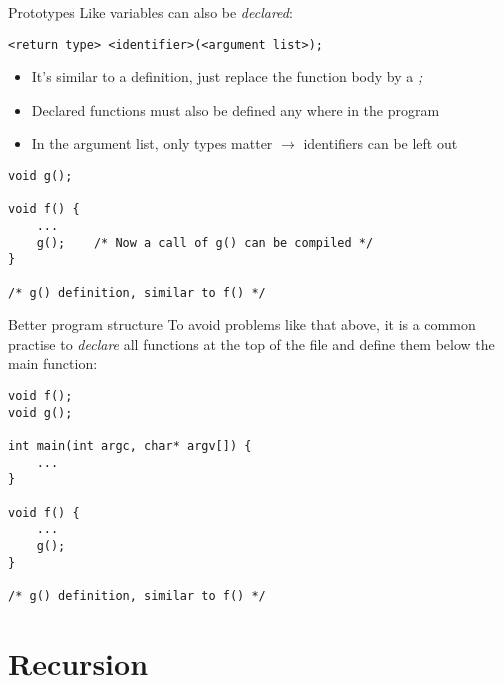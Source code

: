 \begin{frame}[fragile]{Prototypes}
	Like variables can also be \textit{declared}:
	\begin{lstlisting}[numbers=none]
<return type> <identifier>(<argument list>);
\end{lstlisting}
	\begin{itemize}
		\item It's similar to a definition, just replace the function body by a \textit{;}
		\item Declared functions must also be defined any where in the program
		\item In the argument list, only types matter $\rightarrow$ identifiers can be left out
	\end{itemize}
	\begin{lstlisting}
void g();

void f() {
	...
	g();	/* Now a call of g() can be compiled */
}

/* g() definition, similar to f() */
\end{lstlisting}
\end{frame}
\begin{frame}[fragile]{Better program structure}
	To avoid problems like that above, it is a common practise to \textit{declare} all functions at the top of the file and define them below the main function:
	\begin{lstlisting}
void f();
void g();

int main(int argc, char* argv[]) {
	...
}

void f() {
	...
	g();
}

/* g() definition, similar to f() */
\end{lstlisting}
\end{frame}
\section{Recursion}
